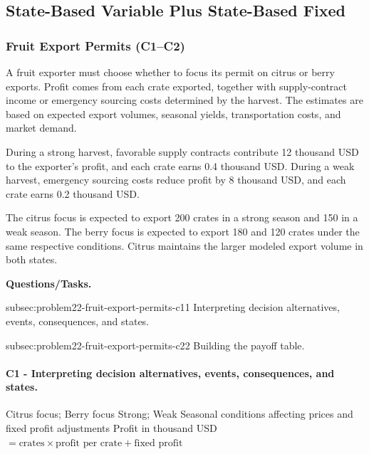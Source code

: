 	
	\subsection{State-Based Variable Plus State-Based Fixed}
	\label{sec:state-based-variable-payoff-plus-state-based-fixed-payoff}



	\subsubsection{Fruit Export Permits (C1--C2)}
	\label{sec:problem22-fruit-export-permits-c1-c2}
	
	A fruit exporter must choose whether to focus its permit on citrus or berry exports. Profit comes from each crate exported, together with supply-contract income or emergency sourcing costs determined by the harvest. The estimates are based on expected export volumes, seasonal yields, transportation costs, and market demand.
	
	During a strong harvest, favorable supply contracts contribute 12 thousand USD to the exporter’s profit, and each crate earns 0.4 thousand USD. During a weak harvest, emergency sourcing costs reduce profit by 8 thousand USD, and each crate earns 0.2 thousand USD.
	
	The citrus focus is expected to export 200 crates in a strong season and 150 in a weak season. The berry focus is expected to export 180 and 120 crates under the same respective conditions. Citrus maintains the larger modeled export volume in both states.

	\textbf{Questions/Tasks.}
	\begin{enumerate}
		\CriterionTask
		{subsec:problem22-fruit-export-permits-c1}{1}
		{Interpreting decision alternatives, events, consequences, and states.}

		\CriterionTask
		{subsec:problem22-fruit-export-permits-c2}{2}
		{Building the payoff table.}
	\end{enumerate}

\paragraph*{C1 - Interpreting decision alternatives, events, consequences, and states.}
	\label{subsec:problem22-fruit-export-permits-c1}
	\DecisionElementsTable
	{Citrus focus; Berry focus}
	{Strong; Weak}
	{Seasonal conditions affecting prices and fixed profit adjustments}
	{Profit in thousand USD $= \text{crates} \times \text{profit per crate} + \text{fixed profit}$}

